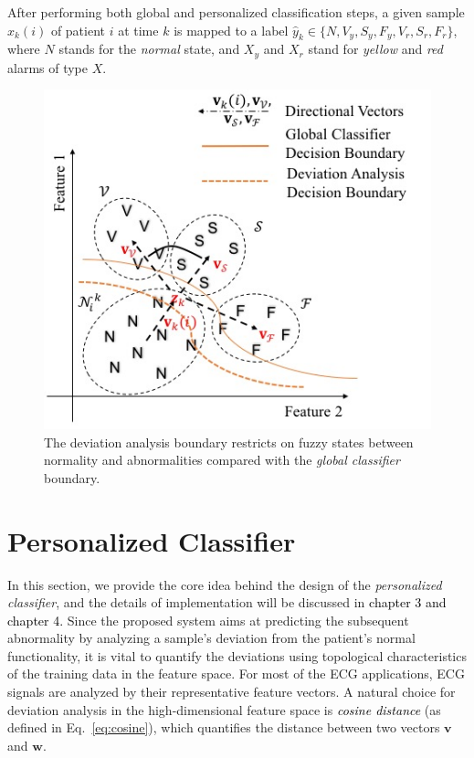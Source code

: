 After performing both global and personalized classification steps, a given sample $x_k(i)$ of patient $i$ at time $k$ is mapped to a label $\hat{y}_k \in \{N,V_y,S_y,F_y,V_r,S_r,F_r\}$, where $N$ stands for the \textit{normal} state, and $X_y$ and $X_r$ stand for \textit{yellow} and \textit{red} alarms of type $X$.

\begin{figure}[t]
\centering
\includegraphics[scale=.6]{Fig/topology.jpg}
\caption{The deviation analysis boundary restricts on fuzzy states between normality and abnormalities compared with the \textit{global classifier} boundary.}
\label{fig:topo_deviation}
\end{figure}


\section{Personalized Classifier} %

In this section, we provide the core idea behind the design of the \textit{personalized classifier}, and the details of implementation will be discussed in \textcolor{black}{chapter 3 and chapter 4.} 
Since the proposed system aims at predicting the subsequent abnormality by analyzing a sample's deviation from the patient's normal functionality, it is vital to quantify the deviations using topological characteristics of the training data in the feature space. For most of the ECG applications, ECG signals are analyzed by their representative feature vectors. A natural choice for deviation analysis in the high-dimensional feature space is \textcolor{black}{\textit{cosine distance}} (as defined in Eq.~\ref{eq:cosine}), which quantifies the distance between two vectors $\textbf{v}$ and $\textbf{w}$.

